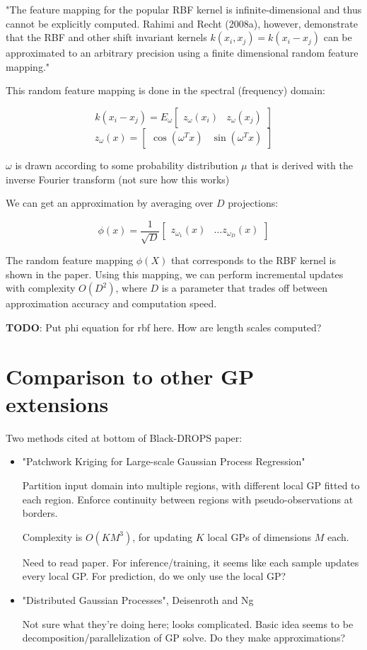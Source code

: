 \documentclass[a4paper]{article}
\begin{document}
"The feature mapping for the popular RBF kernel is infinite-dimensional and thus cannot be explicitly computed. Rahimi and Recht
(2008a), however, demonstrate that the RBF and other shift 
invariant kernels $k(x_i, x_j) = k(x_i − x_j)$ can be approximated to an arbitrary precision using a finite dimensional random feature mapping."

This random feature mapping is done in the spectral (frequency) domain: 

$$k(x_i - x_j) = E_\omega\begin{bmatrix}z_\omega(x_i) & z_\omega(x_j) \end{bmatrix}$$
$$z_\omega(x) = \begin{bmatrix}\cos(\omega^T x) & \sin(\omega^T x)  \end{bmatrix}$$

$\omega$ is drawn according to some probability distribution $\mu$ that is derived with the inverse Fourier transform (not sure how this works)

We can get an approximation by averaging over $D$ projections:

$$\phi(x) = \frac{1}{\sqrt{D}} \begin{bmatrix}z_{\omega_1}(x) & \ldots z_{\omega_D}(x) \end{bmatrix}$$

The random feature mapping $\phi(X)$ that corresponds to the RBF kernel is shown in the paper. Using this mapping, we can perform incremental updates with complexity $O(D^2)$, where $D$ is a parameter that trades off between approximation accuracy and computation speed.

\textbf{TODO}: Put phi equation for rbf here. How are length scales computed?

\section{Comparison to other GP extensions}

Two methods cited at bottom of Black-DROPS paper:

\begin{itemize}
	\item "Patchwork Kriging for Large-scale Gaussian Process Regression"
    
    Partition input domain into multiple regions, with different local GP fitted to each region. Enforce continuity between regions with pseudo-observations at borders. 
    
    Complexity is $O(KM^3)$, for updating $K$ local GPs of dimensions $M$ each. 
    
    Need to read paper. For inference/training, it seems like each sample updates every local GP. For prediction, do we only use the local GP? 
    
    \item "Distributed Gaussian Processes", Deisenroth and Ng 
    
    Not sure what they're doing here; looks complicated. Basic idea seems to be decomposition/parallelization of GP solve. Do they make approximations? 

\end{itemize}
\end{document}
